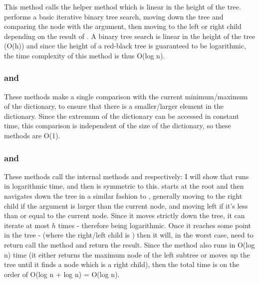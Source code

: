 \subsubsection{}
This method calls the helper method  which is linear in the height of the tree.  performs a basic iterative binary tree search, moving down the tree and comparing the node with the argument, then moving to the left or right child depending on the result of . A binary tree search is linear in the height of the tree (O(h)) and since the height of a red-black tree is guaranteed to be logarithmic, the time complexity of this method is thus O(log n).


\subsubsection{ and }
These methods make a single comparison with the current minimum/maximum of the dictionary, to ensure that there is a smaller/larger element in the dictionary. Since the extremum of the dictionary can be accessed in constant time, this comparison is independent of the size of the dictionary, so these methods are O(1).

\subsubsection{ and }
These methods call the internal methods  and  respectively: I will show that  runs in logarithmic time, and then  is symmetric to this.  starts at the root and then navigates down the tree in a similar fashion to , generally moving to the right child if the argument is larger than the current node, and moving left if it's less than or equal to the current node. Since it moves strictly down the tree, it can iterate at most $h$ times - therefore being logarithmic.
Once it reaches some point in the tree - (where the right/left child is ) then it will, in the worst case, need to return call the  method and return the result. Since the  method also runs in O(log n) time (it either returns the maximum node of the left subtree or moves up the tree until it finds a node which is a right child), then the total time is on the order of O(log n + log n) = O(log n).

